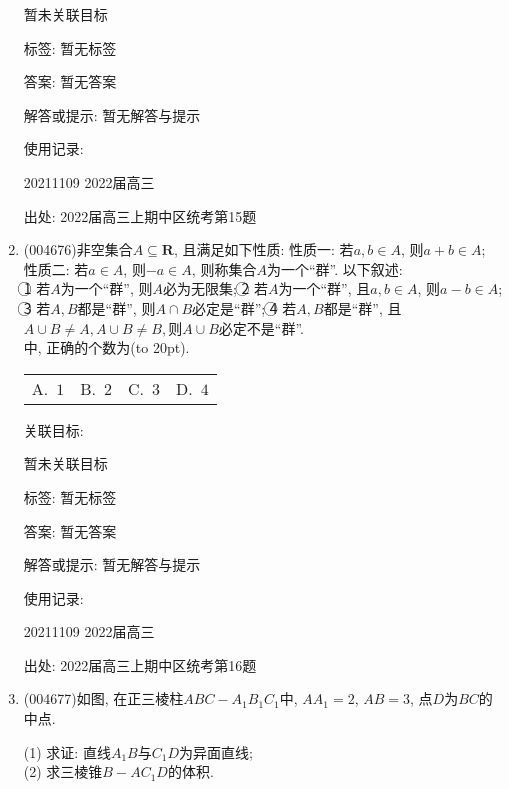 \documentclass[10pt,a4paper]{article}
\newcommand{\bracket}[1]{(\hbox to #1pt{})}
\newcommand{\fourch}[4]{\par\begin{tabular}{p{.23\textwidth}p{.23\textwidth}p{.23\textwidth}p{.23\textwidth}}
A.~#1 &B.~#2& C.~#3& D.~#4
\end{tabular}}
\begin{document}
\begin{enumerate}[1.]
暂未关联目标



标签: 暂无标签

答案: 暂无答案

解答或提示: 暂无解答与提示

使用记录:

20211109	2022届高三	


出处: 2022届高三上期中区统考第15题
\item { (004676)}非空集合$A\subseteq \mathbf{R}$, 且满足如下性质:
性质一: 若$a,b\in A$, 则$a+b\in A$;
性质二: 若$a\in A$, 则$-a\in A$, 则称集合$A$为一个``群''. 以下叙述:\\
\textcircled{1} 若$A$为一个``群'', 则$A$必为无限集;
\textcircled{2} 若$A$为一个``群'', 且$a,b\in A$, 则$a-b\in A$;
\textcircled{3} 若$A,B$都是``群'', 则$A\cap B$必定是``群'';
\textcircled{4} 若$A,B$都是``群'', 且$A\cup B\ne A,A\cup B\ne B,$则$A\cup B$必定不是``群''.\\
中, 正确的个数为\bracket{20}.
\fourch{$1$}{$2$}{$3$}{$4$}


关联目标:

暂未关联目标



标签: 暂无标签

答案: 暂无答案

解答或提示: 暂无解答与提示

使用记录:

20211109	2022届高三	


出处: 2022届高三上期中区统考第16题
\item { (004677)}如图, 在正三棱柱$ABC-A_1B_1C_1$中, $AA_1=2$, $AB=3$, 点$D$为$BC$的中点.
\begin{center}
\end{center}
(1) 求证: 直线$A_1B$与$C_1D$为异面直线;\\
(2) 求三棱锥$B-AC_1D$的体积.



\end{enumerate}
\end{document}
